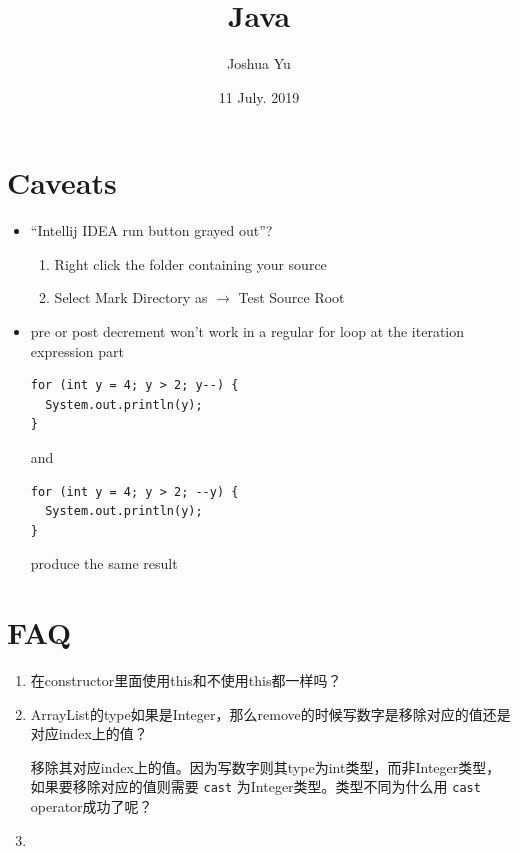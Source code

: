 \documentclass[a4paper, 12pt]{article}
\begin{document}

\large
\title{Java}
\author{Joshua Yu}
\date{11 July. 2019}
\maketitle
\tableofcontents


\section{Caveats}
\begin{itemize}
\item ``Intellij IDEA run button grayed out''?
\begin{enumerate}
\item Right click the folder containing your source
\item Select Mark Directory as $\rightarrow$ Test Source Root
\end{enumerate}

\item pre or post decrement won't work in a regular for loop at the iteration expression part
\begin{verbatim}
for (int y = 4; y > 2; y--) {
  System.out.println(y);
}
\end{verbatim}
and
\begin{verbatim}
for (int y = 4; y > 2; --y) {
  System.out.println(y);
}
\end{verbatim}
produce the same result

\end{itemize}


\section{FAQ}
\begin{enumerate}
\item 在constructor里面使用this和不使用this都一样吗？

\item ArrayList的type如果是Integer，那么remove的时候写数字是移除对应的值还是对应index上的值？

移除其对应index上的值。因为写数字则其type为int类型，而非Integer类型，如果要移除对应的值则需要 \verb|cast| 为Integer类型。{\color{red}类型不同为什么用 \verb|cast| operator成功了呢？}

\item 

\end{enumerate}
\end{document}
